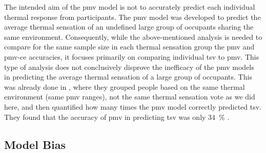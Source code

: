 The intended aim of the \ac{pmv} model is not to accurately predict each individual thermal response from participants.
The \ac{pmv} model was developed to predict the average thermal sensation of an undefined large group of occupants sharing the same environment.
Consequently, while the above-mentioned analysis is needed to compare for the same sample size in each thermal sensation group the \ac{pmv} and \ac{pmv-ce} accuracies, it focuses primarily on comparing individual \ac{tsv} to \ac{pmv}. 
This type of analysis does not conclusively disprove the inefficacy of the \ac{pmv} models in predicting the average thermal sensation of a large group of occupants.
This was already done in , where they grouped people based on the same thermal environment (same \ac{pmv} ranges), not the same thermal sensation vote as we did here, and then quantified how many times the \ac{pmv} model correctly predicted \ac{tsv}. 
They found that the accuracy of \ac{pmv} in predicting \ac{tsv} was only \qty{34}{\percent} . 

\subsection{Model Bias}\label{sec:model-bias}
